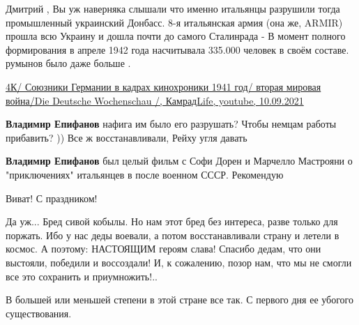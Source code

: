 \begin{itemize}
\begin{itemize}

Дмитрий , Вы уж наверняка слышали что именно итальянцы разрушили тогда
промышленный украинский Донбасс. 8-я итальянская армия (она же, ARMIR) прошла
всю Украину и дошла почти до самого Сталинрада - В момент полного формирования
в апреле 1942 года насчитывала 335.000 человек в своём составе. румынов было
даже больше .


\href{https://youtu.be/PaqfEcmpLYs}{%
4К/ Союзники Германии в кадрах кинохроники 1941 год/ вторая мировая война/Die Deutsche Wochenschau /, %
КамрадLife, youtube, 10.09.2021%
}

\textbf{Владимир Епифанов} нафига им было его разрушать? Чтобы немцам работы прибавить? )) Все ж восстанавливали, Рейху угля давать

\textbf{Владимир Епифанов} был целый фильм с Софи Дорен и Марчелло Мастрояни о "приключениях" итальянцев в после военном СССР. Рекомендую


\end{itemize} %

Виват! С праздником!

Да уж... Бред сивой кобылы.
Но нам этот бред без интереса, разве только для поржать. Ибо у нас деды воевали, а потом восстанавливали страну и летели в космос.
А поэтому: НАСТОЯЩИМ героям слава!
Спасибо дедам, что они выстояли, победили и воссоздали!
И, к сожалению, позор нам, что мы не смогли все это сохранить и приумножить!..

В большей или меньшей степени в этой стране все так. С первого дня ее убогого существования.

\end{itemize} %
